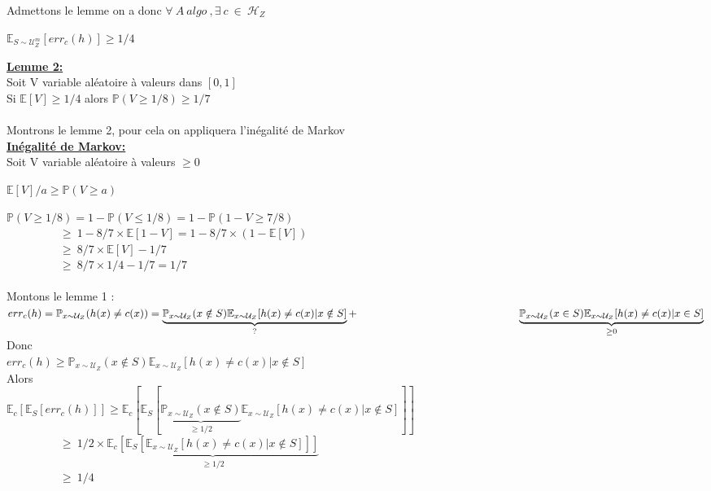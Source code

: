 \documentclass{article}
\begin{document}
Admettons le lemme on a donc $\forall~A~algo~, \exists~c~\in~\mathcal{H}_Z$
\begin{center}
    $\mathbb{E}_{ S \sim \mathcal{U}_Z^m} [err_c(h)] \geq 1/4$
\end{center}
\underline{\textbf{Lemme 2:}}\\
Soit V variable aléatoire à valeurs dans $[0,1]$\\
Si $\mathbb{E} [V] \geq 1/4$ alors $\mathbb{P}(V \geq 1/8) \geq 1/7$\\\\
Montrons le lemme 2, pour cela on appliquera l'inégalité de Markov\\
\underline{\textbf{Inégalité de Markov:}}\\
Soit V variable aléatoire à valeurs $\geq 0$
\begin{center}
    $\mathbb{E}[V]/a \geq \mathbb{P}(V \geq a)$
\end{center}
$\mathbb{P}(V \geq 1/8) = 1 - \mathbb{P}(V \leq 1/8) = 1 - \mathbb{P}(1-V \geq 7/8)$\\
$~~~~~~~~~~~~~~~~~~~~~\geq~ 1 - 8/7 \times \mathbb{E}[1-V] = 1 - 8/7 \times (1 - \mathbb{E}[V])$\\
$~~~~~~~~~~~~~~~~~~~~~\geq~ 8/7 \times \mathbb{E}[V] - 1/7$ \\
$~~~~~~~~~~~~~~~~~~~~~\geq~ 8/7 \times 1/4 - 1/7 = 1/7$\\\\
Montons le lemme 1 :\\
$err_c(h) = 
\mathbb{P}_{x \sim \mathcal{U}_Z}(h(x) \neq c(x)) =
\underbrace{\mathbb{P}_{x \sim \mathcal{U}_Z}(x \notin S) \mathbb{E}_{x \sim \mathcal{U}_Z}[h(x) \neq c(x) | x \notin S]}_{\textrm{?}}+\\ 
~~~~~~~~~~~~~~~~~~~~~~~~~~~~~~~~~~~~~~~~~~~~~\underbrace{\mathbb{P}_{x \sim \mathcal{U}_Z}(x \in S) \mathbb{E}_{x \sim \mathcal{U}_Z}[h(x) \neq c(x) | x \in S]}_{\mathrm{\geq 0}}$\\
Donc\\ $err_c(h) \geq \mathbb{P}_{x \sim \mathcal{U}_Z}(x \notin S) \mathbb{E}_{x \sim \mathcal{U}_Z}[h(x) \neq c(x) | x \notin S]$\\
Alors\\
$\mathbb{E}_c [ \mathbb{E}_S [ err_c (h) ] ] \geq \mathbb{E}_c [ \mathbb{E}_S [\underbrace{ \mathbb{P}_{x \sim \mathcal{U}_Z}(x \notin S)}_{\mathrm{\geq 1/2}} \mathbb{E}_{x \sim \mathcal{U}_Z}[h(x) \neq c(x) | x \notin S] ] ]$\\
$~~~~~~~~~~~~~~~~~~~~~\geq~ 1/2 \times \underbrace{\mathbb{E}_c [ \mathbb{E}_S [ \mathbb{E}_{x \sim \mathcal{U}_Z}[h(x) \neq c(x) | x \notin S] ] ]}_{\mathrm{\geq 1/2}}$\\
$~~~~~~~~~~~~~~~~~~~~~\geq~ 1/4$
\end{document}
